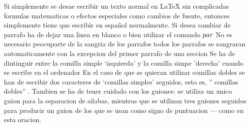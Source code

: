 \documentclass[a4paper,10pt]{letter}
\begin{document}
Si simplemente se desae escribir un texto normal en LaTeX
sin complicadas formulas matematicas o efectos especiales
como cambios de fuente, entonces simplemente tiene que escribir
en español normalmente.
Si desea cambiar de parrafo ha de dejar una linea en blanco o bien
utilizar el comando $\\par$
No es necesario peocuparte de la sangria de los parrafos
todos los parrafos se sangraran automaticamente con la excepcion 
del primer parrafo de una seccion
Se ha de dintinguir entre la comilla simple `izquierda' 
y la comilla simpe 'derecha' cuando se escribe en el ordenador
En el caso de que se quieran utilizar comillas dobles se han de escribir dos caracteres de `comillas simples' seguidos, esto  es, 
'' comillas dobles'' .
Tambien se ha de tener cuidado con los guiones: se utiliza un unico
guion para la separacion de silabas, mientras que se utilizan
tres guiones seguidos para producir un guion de los que se usan 
como signo de puntuacion --- como en esta oracion.
\end{document}
